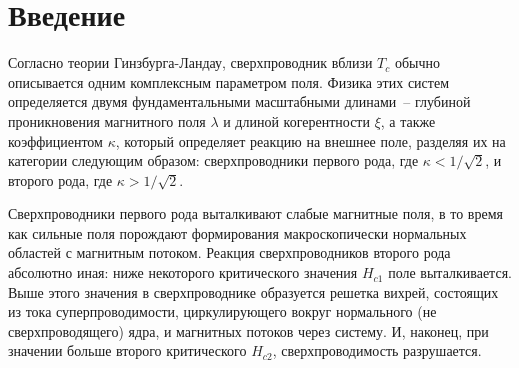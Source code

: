 \chapter{Введение}
\label{ch:1}

Согласно теории Гинзбурга-Ландау, сверхпроводник вблизи \( T_c \) обычно
описывается одним комплексным параметром поля. Физика этих систем определяется
двумя фундаментальными масштабными длинами~-- глубиной проникновения магнитного 
поля \( \lambda \) и длиной когерентности \( \xi \), а также коэффициентом 
\( \kappa \), который определяет реакцию на внешнее поле, разделяя их на 
категории следующим образом: сверхпроводники первого рода, где 
\( \kappa < 1/\sqrt{2} \), и второго рода, где
\( \kappa > 1/\sqrt{2} \)\cite{bib:3}.

Сверхпроводники первого рода выталкивают слабые магнитные поля, в то время как
сильные поля порождают формирования макроскопически нормальных областей с
магнитным потоком\cite{bib:4}. Реакция сверхпроводников второго рода
абсолютно иная: ниже некоторого критического значения \( H_{c1} \) поле
выталкивается. Выше этого значения в сверхпроводнике образуется решетка вихрей,
состоящих из тока суперпроводимости, циркулирующего вокруг нормального
(не сверхпроводящего) ядра, и магнитных потоков через систему. И, наконец, при
значении больше второго критического \( H_{c2} \), сверхпроводимость
разрушается.

